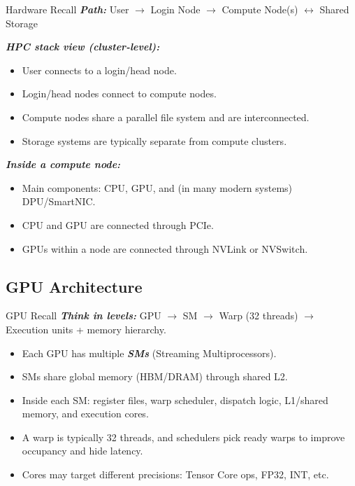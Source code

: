 \documentclass[12pt]{article}
\let\origtextbf\textbf
\renewcommand{\textbf}[1]{\origtextbf{\textit{#1}}}
\begin{document}
\begin{bluebox}{Hardware Recall}
\textbf{Path:} User $\rightarrow$ Login Node $\rightarrow$ Compute Node(s) $\leftrightarrow$ Shared Storage
\end{bluebox}

\textbf{HPC stack view (cluster-level):}
\begin{itemize}
\item User connects to a login/head node.
\item Login/head nodes connect to compute nodes.
\item Compute nodes share a parallel file system and are interconnected.
\item Storage systems are typically separate from compute clusters.
\end{itemize}

\textbf{Inside a compute node:}
\begin{itemize}
\item Main components: CPU, GPU, and (in many modern systems) DPU/SmartNIC.
\item CPU and GPU are connected through PCIe.
\item GPUs within a node are connected through NVLink or NVSwitch.
\end{itemize}

\subsection{GPU Architecture}

\begin{bluebox}{GPU Recall}
\textbf{Think in levels:} GPU $\rightarrow$ SM $\rightarrow$ Warp (32 threads) $\rightarrow$ Execution units + memory hierarchy.
\end{bluebox}

\begin{itemize}
\item Each GPU has multiple \textbf{SMs} (Streaming Multiprocessors).
\item SMs share global memory (HBM/DRAM) through shared L2.
\item Inside each SM: register files, warp scheduler, dispatch logic, L1/shared memory, and execution cores.
\item A warp is typically 32 threads, and schedulers pick ready warps to improve occupancy and hide latency.
\item Cores may target different precisions: Tensor Core ops, FP32, INT, etc.
\end{itemize}
\end{document}
